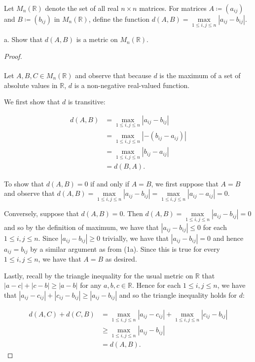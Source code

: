 Let $M_n(\mathbb{R})$ denote the set of all real $n \times n$ matrices. For matrices
$A \coloneqq (a_{ij})$ and $B \coloneqq (b_{ij})$ in $M_n{(\mathbb{R})}$, define
the function $d(A, B) = \max\limits_{1 \le i,j \le n}{|a_{ij} - b_{ij}|}$.

a.  Show that $d(A, B)$ is a metric on $M_n(\mathbb{R})$. \ \\

    \begin{proof}\ \\\\
        Let $A, B, C \in M_n(\mathbb{R})$ and observe that because $d$ is the maximum of a set of absolute values in
        $\mathbb{R}$, $d$ is a non-negative real-valued function.
        
        We first show that $d$ is transitive:

        \begin{align*}
            d(A, B) &= \max\limits_{1 \le i,j \le n}{|a_{ij} - b_{ij}|} \\
                    &= \max\limits_{1 \le i,j \le n}{|-(b_{ij} - a_{ij})|} \\
                    &= \max\limits_{1 \le i,j \le n}{|b_{ij} - a_{ij}|} \\
                    &= d(B, A). 
        \end{align*}

        To show that $d(A, B) = 0$ if and only if $A = B$, we first suppose that $A = B$ and observe that
        $d(A, B) = \max\limits_{1 \le i,j \le n}{|a_{ij} - b_{ij}|} = \max\limits_{1 \le i,j \le n}{|a_{ij} - a_{ij}|} = 0$.
        
        Conversely, suppose that $d(A, B) = 0$. Then $d(A, B) = \max\limits_{1 \le i,j \le n}{|a_{ij} - b_{ij}|} = 0$
        and so by the definition of maximum, we have that $|a_{ij} - b_{ij}| \le 0$ for each $1 \le i, j \le n$. Since
        $|a_{ij} - b_{ij}| \ge 0$ trivially, we have that $|a_{ij} - b_{ij}| = 0$ and hence $a_{ij} = b_{ij}$ by a
        similar argument as from (1a). Since this is true for every $1 \le i, j \le n$, we have that $A = B$ as
        desired.
        
        Lastly, recall by the triangle inequality for the usual metric on $\mathbb{R}$ that 
        $|a - c| + |c - b| \ge |a - b|$ for any $a, b, c \in \mathbb{R}$. Hence for each $1 \le i, j \le n$, we have
        that $|a_{ij} - c_{ij}| + |c_{ij} - b_{ij}| \ge |a_{ij} - b_{ij}|$ and so the triangle inequality holds for $d$:

        \begin{align*}
            d(A, C) + d(C, B) &= \max\limits_{1 \le i,j \le n}{|a_{ij} - c_{ij}|} + \max\limits_{1 \le i,j \le n}{|c_{ij} - b_{ij}|} \\
                              &\ge \max\limits_{1 \le i,j \le n}{|a_{ij} - b_{ij}|} \\
                              &= d(A, B).
        \end{align*}
    \end{proof}

